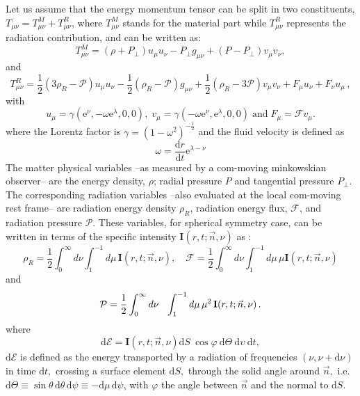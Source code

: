 \documentclass[notitlepage,letterpaper, 10pt]{article}
\begin{document}
Let us assume that the energy momentum tensor can be split in two constituents, $T_{\mu\nu} = T_{\mu\nu}^{M} + T_{\mu\nu}^{R}$, where $T_{\mu\nu}^{M}$ stands for the  material part while $T_{\mu\nu}^{R}$ represents the radiation contribution, and can be written as:
\begin{equation}
\label{TmunuMat}
{T}^{M}_{\mu \nu}= (\rho + P_{\perp}) u_\mu u_\nu - P_{\perp} g_{\mu \nu}  + (P-P_{\perp}) v_\mu v_\nu  ,
\end{equation}
and 
\begin{equation}
\label{TmunuRad}
T^{R}_{\mu \nu}= \frac{1}{2}(3\rho_{R}-\mathcal{P})u_\mu u_\nu - \frac{1}{2}(\rho_{R}-\mathcal{P})g_{\mu \nu}  +\frac{1}{2}(\rho_{R} -3\mathcal{P})v_\mu v_\nu  + F_\mu u_\nu + F_\nu u_\mu \,,
\end{equation}
with 
\begin{equation}
u_\mu = \gamma (\mathrm{e}^{\nu}, -\omega \mathrm{e}^{\lambda}, 0, 0) , \;
v_\mu = \gamma (-\omega \mathrm{e}^{\nu}, \mathrm{e}^{\lambda}, 0, 0)  \; \mathrm{and} \;
F_\mu =  \mathcal{F}v_\mu. 
\label{umu}
\end{equation}
where the Lorentz factor is $\gamma=\left(1-\omega^2 \right)^{-\frac{1}{2}}$ and the fluid velocity is defined as
\begin{equation}
\omega = \frac{\mathrm{d} r}{ \mathrm{d} t} \mathrm{e}^{\lambda -\nu}
\label{velocity1}
\end{equation}
The matter physical variables --as measured by a com-moving minkowskian observer--  are the energy density, $\rho$; radial pressure $P$ and tangential pressure $P_{\perp}$.  The corresponding radiation variables --also evaluated at the local com-moving rest frame-- are radiation energy density $\rho_{R}$, radiation energy flux, $\mathcal{F}$, and radiation pressure $\mathcal{P}$. These variables, for spherical symmetry case, can be written  in terms of the specific intensity $\mathbf{I}(r,t;\vec{n},\nu)$ as \cite{Lindquist1966,MihalasMihalas1984,RezzollaMiller1994}:
\begin{equation}
\rho_{R}=\frac{1}{2} \int_{0}^{\infty}d\nu  \int_{1}^{-1}d\mu \, \mathbf{I}(r,t;\vec{n},\nu), \quad \mathcal{F}=\frac{1}{2} \int_{0}^{\infty}d\nu  \int_{1}^{-1}d\mu \, \mu  \mathbf{I} (r,t;\vec{n},\nu)\label{eq_0mom} 
\end{equation}
and
\begin{equation}
\mathcal{P}=\frac{1}{2} \int_{0}^{\infty}d\nu\hspace{0.25cm}\int_{1}^{-1}
d\mu\, \mu^{2} \, \mathbf{I}(r,t;\vec{n},\nu) \,.\label{eq_2mom}
\end{equation}
where
\begin{equation}
\mathrm{d}\mathcal{E}=\mathbf{I}(r,t;{\vec{n}},{\nu})\mathrm{d}S\ \cos
\varphi\ \mathrm{d}\Theta\ \mathrm{d}\upsilon\ \mathrm{d}t,
\end{equation}
$\mathrm{d}\mathcal{E}$ is defined as the energy transported by a radiation of frequencies $\left(  \nu,\nu +\mathrm{d}\nu \right)$ in time $\mathrm{d}t,$ crossing a surface element $\mathrm{d}S,$ through the solid angle around ${\vec{n},}$ i.e. $\mathrm{d}\Theta \equiv
 \sin\theta \, \mathrm{d}\theta \, \mathrm{d}\psi \equiv -\mathrm{d}\mu \, \mathrm{d}\psi$, with $\varphi$ the angle between ${\vec{n}}$ and the normal to $\mathrm{d}S$.
 
\end{document}
